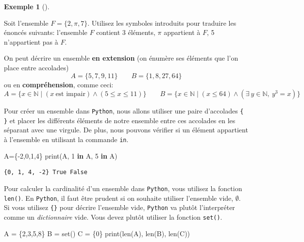 \documentclass[
  letterpaper,
]{scrbook}
\newenvironment{Shaded}{\begin{snugshade}}{\end{snugshade}}
\newcommand{\BuiltInTok}[1]{\textcolor[rgb]{0.00,0.50,0.00}{#1}}
\newcommand{\DecValTok}[1]{\textcolor[rgb]{0.25,0.63,0.44}{#1}}
\newcommand{\KeywordTok}[1]{\textcolor[rgb]{0.00,0.44,0.13}{\textbf{#1}}}
\newcommand{\NormalTok}[1]{\textcolor[rgb]{0.00,0.44,0.13}{#1}}
\newcommand{\OperatorTok}[1]{\textcolor[rgb]{0.40,0.40,0.40}{#1}}
\newcommand{\set}[1]{\{#1\}}
\theoremstyle{plain}
\theoremstyle{definition}
\theoremstyle{definition}
\newtheorem{example}{Exemple}[chapter]
\theoremstyle{remark}
\begin{document}
\begin{example}[]\protect\hypertarget{exm-ensemble-simple}{}\label{exm-ensemble-simple}

Soit l'ensemble \(F=\set{2,\pi,7}\). Utilisez les symboles introduits
pour traduire les énoncés suivants: l'ensemble \(F\) contient 3
éléments, \(\pi\) appartient à \(F\), 5 n'appartient pas à \(F\).

\end{example}

On peut décrire un ensemble \textbf{en extension} (on énumère ses
éléments que l'on place entre accolades) \[
A=\set{5,7,9,11} \qquad B=\set{1,8,27,64}
\] ou en \textbf{compréhension}, comme ceci: \[
A=\set{x\in\mathbb{N}\mid (x\ \text{est impair}) \wedge (5\leq x \leq 11)} \qquad
B=\set{x\in\mathbb{N}\mid (x \leq 64) \wedge (\exists\ y\in \mathbb{N},\ y^3=x)}
\]

Pour créer un ensemble dans \texttt{Python}, nous allons utiliser une
paire d'accolades \texttt{\{} \texttt{\}} et placer les différents
éléments de notre ensemble entre ces accolades en les séparant avec une
virgule. De plus, nous pouvons vérifier si un élément appartient à
l'ensemble en utilisant la commande \texttt{in}.

\hypertarget{ensemble-accolades}{}
\begin{Shaded}
\begin{Highlighting}[]
\NormalTok{A}\OperatorTok{=}\NormalTok{\{}\OperatorTok{{-}}\DecValTok{2}\NormalTok{,}\DecValTok{0}\NormalTok{,}\DecValTok{1}\NormalTok{,}\DecValTok{4}\NormalTok{\}}
\BuiltInTok{print}\NormalTok{(A, }\DecValTok{1} \KeywordTok{in}\NormalTok{ A, }\DecValTok{5} \KeywordTok{in}\NormalTok{ A)}
\end{Highlighting}
\end{Shaded}

\begin{verbatim}
{0, 1, 4, -2} True False
\end{verbatim}

Pour calculer la cardinalité d'un ensemble dans \texttt{Python}, vous
utilisez la fonction \texttt{len()}. En \texttt{Python}, il faut être
prudent si on souhaite utiliser l'ensemble vide, \(\emptyset\). Si vous
utilisez \texttt{\{\}} pour décrire l'ensemble vide, \texttt{Python} va
plutôt l'interpréter comme un \emph{dictionnaire} vide. Vous devez
plutôt utiliser la fonction \texttt{set()}.

\hypertarget{cardinalite-python}{}
\begin{Shaded}
\begin{Highlighting}[]
\NormalTok{A }\OperatorTok{=}\NormalTok{ \{}\DecValTok{2}\NormalTok{,}\DecValTok{3}\NormalTok{,}\DecValTok{5}\NormalTok{,}\DecValTok{8}\NormalTok{\}}
\NormalTok{B }\OperatorTok{=} \BuiltInTok{set}\NormalTok{()}
\NormalTok{C }\OperatorTok{=}\NormalTok{ \{}\DecValTok{0}\NormalTok{\}}
\BuiltInTok{print}\NormalTok{(}\BuiltInTok{len}\NormalTok{(A), }\BuiltInTok{len}\NormalTok{(B), }\BuiltInTok{len}\NormalTok{(C))}
\end{Highlighting}
\end{Shaded}
\end{document}
